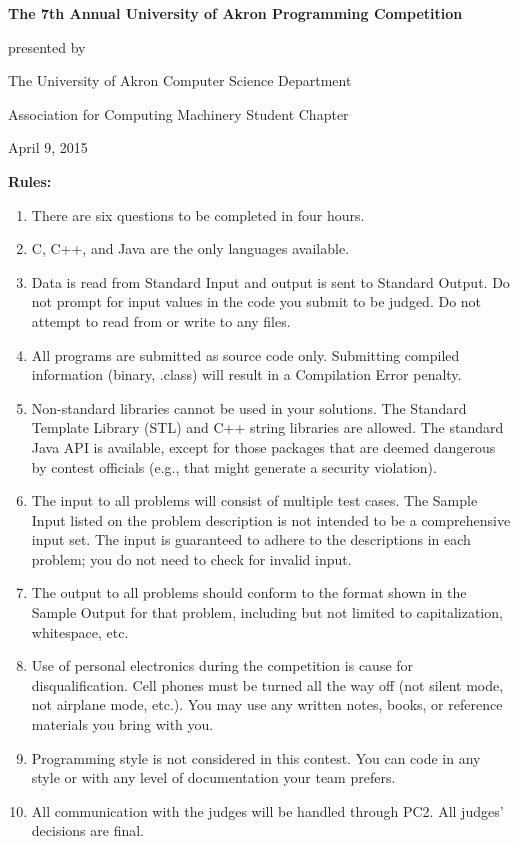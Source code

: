 \begin{center}
\large
\textbf{The 7th Annual University of Akron Programming Competition}

\vspace{.25in}

presented by

The University of Akron Computer Science Department

Association for Computing Machinery Student Chapter

\vspace{.25in}

April 9, 2015
\end{center}

\textbf{Rules:}
\begin{enumerate} \itemsep10pt \parskip0pt 
\item There are six questions to be completed in four hours.
\item C, C++, and Java are the only languages available.
\item Data is read from Standard Input and output is sent to Standard Output. Do not prompt for input values in the code you submit to be judged. Do not attempt to read from or write to any files.
\item All programs are submitted as source code only. Submitting compiled information (binary, .class) will result in a Compilation Error penalty.
\item Non-standard libraries cannot be used in your solutions. The Standard Template Library (STL) and C++ string libraries are allowed. The standard Java API is available, except for those packages that are deemed dangerous by contest officials (e.g., that might generate a security violation).
\item The input to all problems will consist of multiple test cases. The Sample Input listed on the problem description is not intended to be a comprehensive input set. The input is guaranteed to adhere to the descriptions in each problem; you do not need to check for invalid input.
\item The output to all problems should conform to the format shown in the Sample Output for that problem, including but not limited to capitalization, whitespace, etc.
\item Use of personal electronics during the competition is cause for disqualification. Cell phones must be turned all the way off (not silent mode, not airplane mode, etc.). You may use any written notes, books, or reference materials you bring with you.
\item Programming style is not considered in this contest. You can code in any style or with any level of documentation your team prefers.
\item All communication with the judges will be handled through PC2. All judges’ decisions are final.
\end{enumerate}
